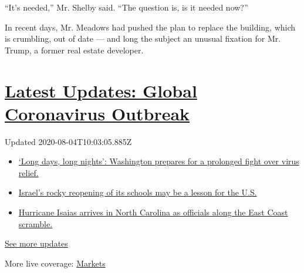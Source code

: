 ``It's needed,'' Mr. Shelby said. ``The question is, is it needed now?''

In recent days, Mr. Meadows had pushed the plan to replace the building,
which is crumbling, out of date --- and long the subject an unusual
fixation for Mr. Trump, a former real estate developer.

\hypertarget{latest-updates-global-coronavirus-outbreak}{%
\section{\texorpdfstring{\href{https://www.nytimes3xbfgragh.onion/2020/08/04/world/coronavirus-covid-19.html?action=click\&pgtype=Article\&state=default\&region=MAIN_CONTENT_1\&context=storylines_live_updates}{Latest
Updates: Global Coronavirus
Outbreak}}{Latest Updates: Global Coronavirus Outbreak}}\label{latest-updates-global-coronavirus-outbreak}}

Updated 2020-08-04T10:03:05.885Z

\begin{itemize}
\tightlist
\item
  \href{https://www.nytimes3xbfgragh.onion/2020/08/04/world/coronavirus-covid-19.html?action=click\&pgtype=Article\&state=default\&region=MAIN_CONTENT_1\&context=storylines_live_updates\#link-6b644638}{`Long
  days, long nights': Washington prepares for a prolonged fight over
  virus relief.}
\item
  \href{https://www.nytimes3xbfgragh.onion/2020/08/04/world/coronavirus-covid-19.html?action=click\&pgtype=Article\&state=default\&region=MAIN_CONTENT_1\&context=storylines_live_updates\#link-7af9fca0}{Israel's
  rocky reopening of its schools may be a lesson for the U.S.}
\item
  \href{https://www.nytimes3xbfgragh.onion/2020/08/04/world/coronavirus-covid-19.html?action=click\&pgtype=Article\&state=default\&region=MAIN_CONTENT_1\&context=storylines_live_updates\#link-33bf9168}{Hurricane
  Isaias arrives in North Carolina as officials along the East Coast
  scramble.}
\end{itemize}

\href{https://www.nytimes3xbfgragh.onion/2020/08/04/world/coronavirus-covid-19.html?action=click\&pgtype=Article\&state=default\&region=MAIN_CONTENT_1\&context=storylines_live_updates}{See
more updates}

More live coverage:
\href{https://www.nytimes3xbfgragh.onion/live/2020/08/04/business/stock-market-today-coronavirus?action=click\&pgtype=Article\&state=default\&region=MAIN_CONTENT_1\&context=storylines_live_updates}{Markets}

